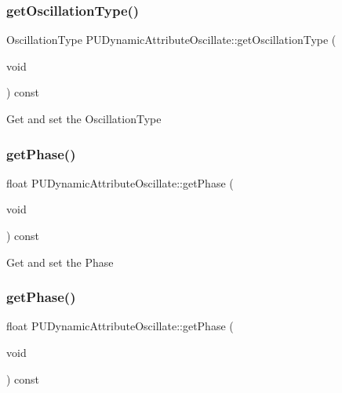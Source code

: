 \subsubsection{\texorpdfstring{get\+Oscillation\+Type()}{getOscillationType()}\hspace{0.1cm}{\footnotesize\ttfamily [2/2]}}
{\footnotesize\ttfamily Oscillation\+Type P\+U\+Dynamic\+Attribute\+Oscillate\+::get\+Oscillation\+Type (\begin{DoxyParamCaption}\item[{void}]{ }\end{DoxyParamCaption}) const}

Get and set the Oscillation\+Type \mbox{\label{classPUDynamicAttributeOscillate_a015486ebdae8dd9c71dd1bed413c5119}} 
\subsubsection{\texorpdfstring{get\+Phase()}{getPhase()}\hspace{0.1cm}{\footnotesize\ttfamily [1/2]}}
{\footnotesize\ttfamily float P\+U\+Dynamic\+Attribute\+Oscillate\+::get\+Phase (\begin{DoxyParamCaption}\item[{void}]{ }\end{DoxyParamCaption}) const}

Get and set the Phase \mbox{\label{classPUDynamicAttributeOscillate_a015486ebdae8dd9c71dd1bed413c5119}} 
\subsubsection{\texorpdfstring{get\+Phase()}{getPhase()}\hspace{0.1cm}{\footnotesize\ttfamily [2/2]}}
{\footnotesize\ttfamily float P\+U\+Dynamic\+Attribute\+Oscillate\+::get\+Phase (\begin{DoxyParamCaption}\item[{void}]{ }\end{DoxyParamCaption}) const}

